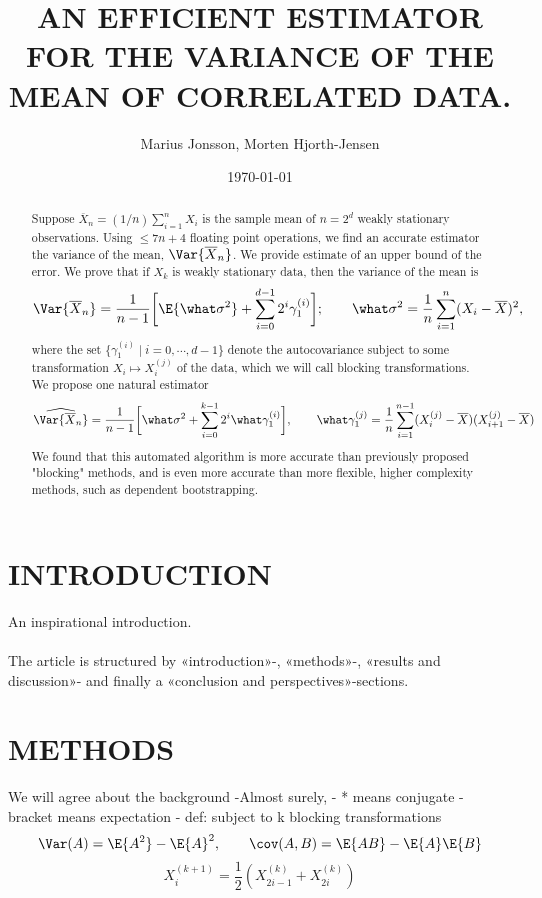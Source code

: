 \documentclass[11pt,english,a4paper]{article}
\author{\normalsize Marius Jonsson, Morten Hjorth-Jensen}
\title{\bf \uppercase{An efficient estimator for the variance of the mean of correlated data.}}
\date{\normalsize \today}
\begin{document}
\maketitle
\begin{abstract} \normalsize
Suppose $\overline{ X}_n = (1/n) \sum_{i=1}^{n} X_i$ is the sample mean of $n = 2^d$ weakly stationary observations. Using $\leq 7n+4$ floating point operations, we find an accurate estimator the variance of the mean, $\Var{\overline{X}_n}$. We provide estimate of an upper bound of the error. We prove that if $X_k$ is weakly stationary data, then the variance of the mean is
\[
\Var{\overline{X}_n} = \frac{1}{n-1} \bigg[ \E{\what \sigma^2} + \sum_{i=0}^{d-1}2^i \gamma^{(i)}_1  \bigg]; \qquad \what \sigma^2 = \frac{1}{n} \sum_{i=1}^n (X_i - \overline{X})^2,
\]
where the set $\{\gamma_1^{(i)} \;|\; i = 0,\cdots,d-1 \}$ denote the autocovariance subject to some transformation $X_i \mapsto X_i^{(j)}$ of the data, which we will call blocking transformations. We propose one natural estimator
\[
\widehat{\Var{\overline{X}_n}} = \frac{1}{n-1} \bigg[ \what \sigma^2 + \sum_{i=0}^{k-1}2^i \what \gamma^{(i)}_1  \bigg], \qquad \what \gamma^{(j)}_1 = \frac{1}{n} \sum_{i=1}^{n-1} (X_i^{(j)} - \overline{X})(X_{i+1}^{(j)} - \overline{X})
\]
We found that this automated algorithm is more accurate than previously proposed "blocking" methods, and is even more accurate than more flexible, higher complexity methods, such as dependent bootstrapping.
\end{abstract}
\section*{\uppercase{Introduction}}
An inspirational introduction.\\
\\
The article is structured by «introduction»-, «methods»-, «results and discussion»- and finally a «conclusion and perspectives»-sections.
\section*{\uppercase{Methods}}
We will agree about the background
-Almost surely,
- * means conjugate
- bracket means expectation
- def: subject to k blocking transformations
\begin{equation}
\Var(A) = \E{A^2} - \E{A}^2, \qquad \cov(A,B) = \E{AB} - \E{A}\E{B} \label{eq:varcov}
\end{equation}
\begin{equation}
X^{(k+1)}_{i} = \frac{1}{2} \left( X^{(k)}_{2i-1} + X^{(k)}_{2i} \right) \label{eq:block}
\end{equation}
\end{document}
